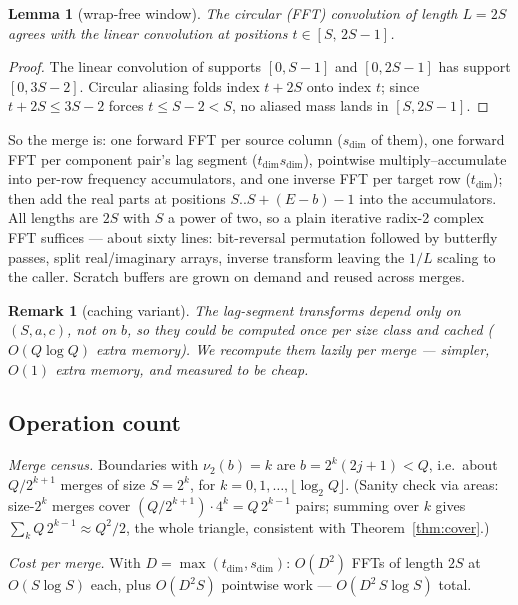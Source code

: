 \documentclass[11pt]{article}
\newtheorem{lemma}{Lemma}
\newtheorem{remark}{Remark}
\newcommand{\vtwo}{\nu_2}
\begin{document}
\begin{lemma}[wrap-free window]
\label{lem:wrap}
The circular (FFT) convolution of length $L=2S$ agrees with the linear
convolution at positions $t\in[S,\,2S-1]$.
\end{lemma}
\begin{proof}
The linear convolution of supports $[0,S{-}1]$ and $[0,2S{-}1]$ has
support $[0,3S{-}2]$. Circular aliasing folds index $t+2S$ onto index
$t$; since $t+2S\le 3S-2$ forces $t\le S-2 < S$, no aliased mass lands
in $[S,2S-1]$.
\end{proof}

So the merge is: one forward FFT per source column ($s_{\dim}$ of
them), one forward FFT per component pair's lag segment
($t_{\dim}s_{\dim}$), pointwise multiply--accumulate into per-row
frequency accumulators, and one inverse FFT per target row
($t_{\dim}$); then add the real parts at positions $S..S+(E-b)-1$ into
the accumulators. All lengths are $2S$ with $S$ a power of two, so a
plain iterative radix-2 complex FFT \cite{ct1965} suffices --- about
sixty lines: bit-reversal permutation followed by butterfly passes,
split real/imaginary arrays, inverse transform leaving the $1/L$
scaling to the caller. Scratch buffers are grown on demand and reused
across merges.

\begin{remark}[caching variant]
The lag-segment transforms depend only on $(S,a,c)$, not on $b$, so
they could be computed once per size class and cached ($O(Q\log Q)$
extra memory). We recompute them lazily per merge --- simpler, $O(1)$
extra memory, and measured to be cheap.
\end{remark}

\subsection{Operation count}
\label{sec:complexity}

\emph{Merge census.} Boundaries with $\vtwo(b)=k$ are
$b = 2^k(2j+1) < Q$, i.e.\ about $Q/2^{k+1}$ merges of size $S=2^k$,
for $k = 0,1,\dots,\lfloor\log_2 Q\rfloor$. (Sanity check via areas:
size-$2^k$ merges cover $(Q/2^{k+1})\cdot 4^k = Q\,2^{k-1}$ pairs;
summing over $k$ gives $\sum_k Q\,2^{k-1}\approx Q^2/2$, the whole
triangle, consistent with Theorem~\ref{thm:cover}.)

\emph{Cost per merge.} With $D=\max(t_{\dim},s_{\dim})$: $O(D^2)$ FFTs
of length $2S$ at $O(S\log S)$ each, plus $O(D^2 S)$ pointwise work
--- $O(D^2\,S\log S)$ total.
\end{document}
